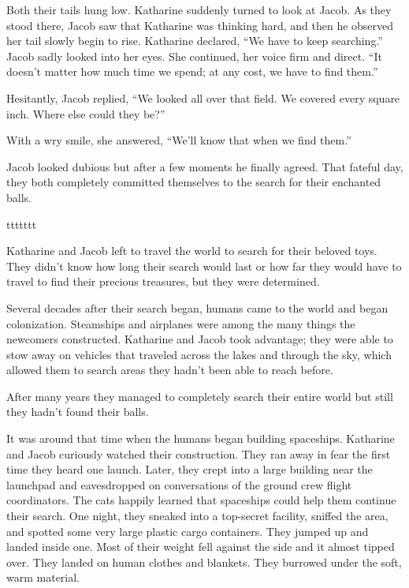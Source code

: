Both their tails hung low. Katharine suddenly turned to look at Jacob. As they stood there, Jacob saw that Katharine was thinking hard, and then he observed her tail slowly begin to rise. Katharine declared, “We have to keep searching.” Jacob sadly looked into her eyes. She continued, her voice firm and direct. “It doesn't matter how much time we spend; at any cost, we have to find them.”

Hesitantly, Jacob replied, “We looked all over that field. We covered every square inch. Where else could they be?”

With a wry smile, she answered, “We'll know that when we find them.”

Jacob looked dubious but after a few moments he finally agreed. That fateful day, they both completely committed themselves to the search for their enchanted balls.



ttttttt



Katharine and Jacob left to travel the world to search for their beloved toys. They didn't know how long their search would last or how far they would have to travel to find their precious treasures, but they were determined. 

Several decades after their search began, humans came to the world and began colonization. Steamships and airplanes were among the many things the newcomers constructed. Katharine and Jacob took advantage; they were able to stow away on vehicles that traveled across the lakes and through the sky, which allowed them to search areas they hadn't been able to reach before.

After many years they managed to completely search their entire world but still they hadn't found their balls.

It was around that time when the humans began building spaceships. Katharine and Jacob curiously watched their construction. They ran away in fear the first time they heard one launch. Later, they crept into a large building near the launchpad and eavesdropped on conversations of the ground crew flight coordinators. The cats happily learned that spaceships could help them continue their search. One night, they sneaked into a top-secret facility, sniffed the area, and spotted some very large plastic cargo containers. They jumped up and landed inside one. Most of their weight fell against the side and it almost tipped over. They landed on human clothes and blankets. They burrowed under the soft, warm material.

